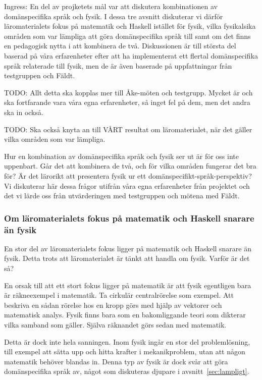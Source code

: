 \begin{binge}
Ingress: En del av projketets mål var att diskutera kombinationen av
domänspecifika språk och fysik. I dessa tre avsnitt diskuterar vi därför
läromaterialets fokus på matematik och Haskell istället för fysik, vilka
fysikalsika områden som var lämpliga att göra domänspecifika språk till samt om
det finns en pedagogisk nytta i att kombinera de två. Diskussionen är till
största del baserad på våra erfarenheter efter att ha implementerat ett flertal
domänspecifika språk relaterade till fysik, men de är även baserade på
uppfattningar från testgruppen och Fäldt.


TODO: Allt detta ska kopplas mer till Åke-möten och testgrupp. Mycket är och ska
fortfarande vara våra egna erfarenheter, så inget fel på dem, men det andra ska
in också.

TODO: Ska också knyta an till VÅRT resultat om läromaterialet, när det gäller
vilka områden som var lämpliga.

Hur en kombination av domänspecifika språk och fysik ser ut är för oss inte
uppenbart. Går det att kombinera de två, och för vilka områden fungerar det bra
för? Är det lärorikt att presentera fysik ur ett
domänspecifikt-språk-perspektiv? Vi diskuterar här dessa frågor utifrån våra
egna erfarenheter från projektet och det vi lärde oss från utvärderingen med
testgruppen och mötena med Fäldt. 

\subsubsection{Om läromaterialets fokus på matematik och Haskell snarare än
fysik}

En stor del av läromaterialets fokus ligger på matematik och Haskell snarare än
fysik. Detta trots att läromaterialet är tänkt att handla om fysik. Varför är
det så?

En orsak till att ett stort fokus ligger på matematik är att fysik egentligen
bara är räkneexempel i matematik. Ta cirkulär centralrörelse som exempel. Att
beskriva en sådan rörelse hos en kropp görs med hjälp av vektorer och matematisk
analys. Fysik finns bara som en bakomliggande teori som dikterar vilka samband
som gäller. Själva räknandet görs sedan med matematik.

Detta är dock inte hela sanningen. Inom fysik ingår en stor del problemlösning,
till exempel att sätta upp och hitta krafter i mekanikproblem, utan att någon
matematik behöver blandas in. Denna typ av fysik är dock svår att göra
domänspecifika språk av, något som diskuteras djupare i
avsnitt~\ref{sec:lampligt}.


\end{binge}
